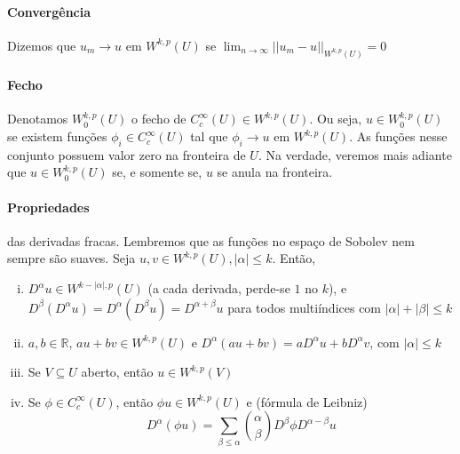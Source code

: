 \documentclass[a4paper, 11pt]{book}
\newcommand{\R}{\mathbb{R}}
\begin{document}
\paragraph{Convergência} Dizemos que \( u_m \rightarrow u\) em \( W^{k,p}(U) \) se \( \lim_{n\rightarrow \infty} ||u_m - u||_{W^{k,p}(U)} =0\)

\paragraph{Fecho} Denotamos \( W^{k,p}_0 (U) \) o fecho de \( C^{\infty}_c(U) \in W^{k,p}(U) \). Ou seja, \( u \in W^{k,p}_0(U) \) se existem funções \( \phi_i \in C^{\infty}_c(U) \) tal que \( \phi_i \rightarrow u \) em \( W^{k,p}(U) \). As funções nesse conjunto possuem valor zero na fronteira de \( U \). Na verdade, veremos mais adiante que $u \in  W^{k,p}_0 (U)$ se, e somente se, $u$ se anula na fronteira.


\paragraph{Propriedades} das derivadas fracas. Lembremos que as funções no espaço de Sobolev nem sempre são suaves. Seja \( u,v \in W^{k,p}(U), |\alpha| \leq k \). Então, \begin{enumerate}[(i)]
	\item \( D^\alpha u \in W^{k-|\alpha|, p}(U) \) (a cada derivada, perde-se \( 1 \) no \( k \)), e\\ \( D^\beta(D^\alpha u)=D^\alpha(D^\beta u) = D^{\alpha + \beta}u \) para todos multiíndices com \( |\alpha|+ |\beta| \leq k \)
	\item \(a, b \in \R \), \( au + bv \in W^{k,p}(U) \) e \( D^\alpha(au +bv) = aD^\alpha u + bD^\alpha v \), com \( |\alpha|\leq k \)
	\item Se \( V \subseteq U \) aberto, então \( u \in W^{k,p}(V) \)
	\item Se \( \phi \in C^\infty_c(U) \), então \( \phi u \in W^{k,p}(U) \) e (fórmula de Leibniz)\[ D^\alpha(\phi u) = \sum_{\beta \leq \alpha} \binom{\alpha}{\beta} D^\beta \phi D^{\alpha - \beta}u \] 
\end{enumerate}
\end{document}
